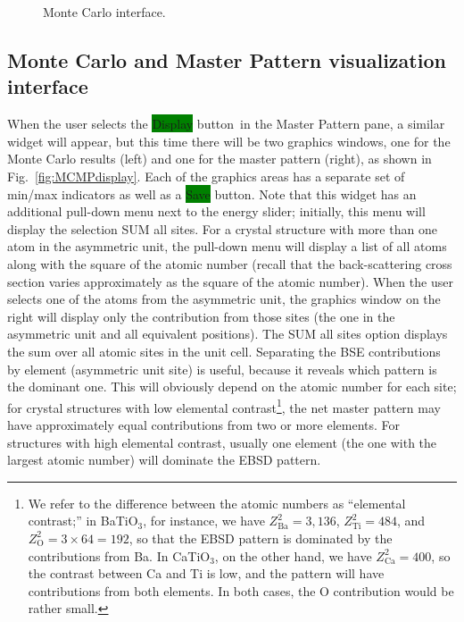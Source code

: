 \documentclass[DIV=calc, paper=letter, fontsize=11pt]{scrartcl}	 %
\newcommand{\button}[1]{\colorbox{green}{\textsf{#1}} button}
\begin{document}
\begin{figure}[t]
\leavevmode\centering
\epsfxsize=3in
\caption{\label{fig:MCdisplay}Monte Carlo interface.}
\end{figure}

\newpage
\subsection{Monte Carlo and Master Pattern visualization interface\label{sec:idlMCMP}}
When the user selects the \button{Display}\ in the Master Pattern pane, a similar widget will appear, but this time there 
will be two graphics windows, one for the Monte Carlo results (left) and one for the master pattern (right), as shown in 
Fig.~\ref{fig:MCMPdisplay}.  Each of the graphics areas has a separate set of min/max indicators as well as a \button{Save}.
Note that this widget has an additional pull-down menu next to the energy slider; initially, this menu will display the selection
\textsf{SUM all sites}.  For a crystal structure with more than one atom in the asymmetric unit, the pull-down menu will
display a list of all atoms along with the square of the atomic number (recall that the back-scattering cross section varies
approximately as the square of the atomic number).  When the user selects one of the atoms from the asymmetric unit, 
the graphics window on the right will display only the contribution from those sites (the one in the asymmetric unit
and all equivalent positions).  The \textsf{SUM all sites} option displays the sum over all atomic sites in the unit cell.
Separating the BSE contributions by element (asymmetric unit site) is useful, because it reveals which pattern is the dominant one.  
This will obviously depend on the atomic number for each site; for crystal structures with low elemental contrast\footnote{We refer
to the difference between the atomic numbers as ``elemental contrast;''  in BaTiO$_3$, for instance, we have $Z^2_{\text{Ba}}=3,136$,
$Z^2_{\text{Ti}}=484$, and $Z^2_{\text{O}}=3\times 64=192$, so that the EBSD pattern is dominated by the contributions from Ba.  In CaTiO$_3$, on the
other hand, we have $Z^2_{\text{Ca}}=400$, so the contrast between Ca and Ti is low, and the pattern will have contributions from
both elements.  In both cases, the O contribution would be rather small.}, the net master pattern may have approximately equal contributions 
from two or more elements.  For structures with high elemental contrast, usually one element (the one with the largest atomic number) will
dominate the EBSD pattern.
\end{document}
